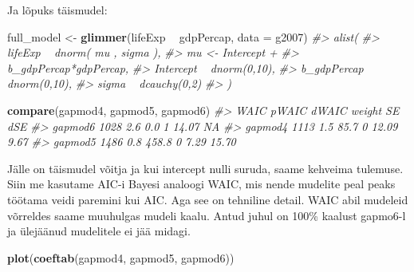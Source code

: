 \documentclass[]{book}
\newenvironment{Shaded}{\begin{snugshade}}{\end{snugshade}}
\newcommand{\CommentTok}[1]{\textcolor[rgb]{0.56,0.35,0.01}{\textit{#1}}}
\newcommand{\DataTypeTok}[1]{\textcolor[rgb]{0.13,0.29,0.53}{#1}}
\newcommand{\KeywordTok}[1]{\textcolor[rgb]{0.13,0.29,0.53}{\textbf{#1}}}
\newcommand{\NormalTok}[1]{#1}
\newcommand{\OperatorTok}[1]{\textcolor[rgb]{0.81,0.36,0.00}{\textbf{#1}}}
\newcommand{\StringTok}[1]{\textcolor[rgb]{0.31,0.60,0.02}{#1}}
\begin{document}
Ja lõpuks täismudel:

\begin{Shaded}
\begin{Highlighting}[]
\NormalTok{full_model <-}\StringTok{ }\KeywordTok{glimmer}\NormalTok{(lifeExp }\OperatorTok{~}\StringTok{ }\NormalTok{gdpPercap, }\DataTypeTok{data =}\NormalTok{ g2007)}
\CommentTok{#> alist(}
\CommentTok{#>     lifeExp ~ dnorm( mu , sigma ),}
\CommentTok{#>     mu <- Intercept +}
\CommentTok{#>         b_gdpPercap*gdpPercap,}
\CommentTok{#>     Intercept ~ dnorm(0,10),}
\CommentTok{#>     b_gdpPercap ~ dnorm(0,10),}
\CommentTok{#>     sigma ~ dcauchy(0,2)}
\CommentTok{#> )}
\end{Highlighting}
\end{Shaded}

\begin{Shaded}
\end{Shaded}

\begin{Shaded}
\begin{Highlighting}[]
\KeywordTok{compare}\NormalTok{(gapmod4, gapmod5, gapmod6)}
\CommentTok{#>         WAIC pWAIC dWAIC weight    SE   dSE}
\CommentTok{#> gapmod6 1028   2.6   0.0      1 14.07    NA}
\CommentTok{#> gapmod4 1113   1.5  85.7      0 12.09  9.67}
\CommentTok{#> gapmod5 1486   0.8 458.8      0  7.29 15.70}
\end{Highlighting}
\end{Shaded}

Jälle on täismudel võitja ja kui intercept nulli suruda, saame kehveima tulemuse.
Siin me kasutame AIC-i Bayesi analoogi WAIC, mis nende mudelite peal peaks töötama veidi paremini kui AIC.
Aga see on tehniline detail.
WAIC abil mudeleid võrreldes saame muuhulgas mudeli kaalu.
Antud juhul on 100\% kaalust gapmo6-l ja ülejäänud mudelitele ei jää midagi.

\begin{Shaded}
\begin{Highlighting}[]
\KeywordTok{plot}\NormalTok{(}\KeywordTok{coeftab}\NormalTok{(gapmod4, gapmod5, gapmod6))}
\end{Highlighting}
\end{Shaded}
\end{document}
